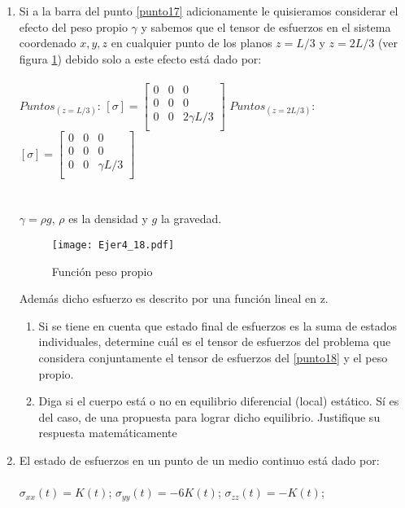 \documentclass[../notas medios.tex]{subfiles}
\begin{document}
\begin{enumerate}
\item \label{punto18}	 Si a la barra del punto \cref{punto17} adicionamente le quisieramos considerar el efecto del peso propio $\gamma$ y sabemos que el tensor de esfuerzos en el sistema coordenado $x,y,z$ en cualquier punto de los planos $z = L/3$ y $z = 2L/3$ (ver figura \ref{barrapeso}) debido solo a este efecto est\'a dado por:\\\\
%
$Puntos_{(z=L/3)}$: $[\sigma] = \left[ \begin{array}{ccc}
0 & 0 & 0\\ 
0 & 0 & 0\\
0 & 0 & 2 \gamma L/3\\
\end{array}  \right] $
\hspace{1cm}
$Puntos_{(z=2L/3)}$: $[\sigma] = \left[ \begin{array}{ccc}
0 & 0 & 0\\ 
0 & 0 & 0\\
0 & 0 & \gamma L/3\\
\end{array}  \right] $
%
\\\\\\
$\gamma = \rho g$, $\rho$ es la densidad y $g$ la gravedad. 
\begin{figure}[H]
	\centering
	\texttt{[image: Ejer4\_18.pdf]} 
	\caption{Funci\'on peso propio}
	\label{barrapeso}
\end{figure}
% 
Adem\'as dicho esfuerzo es descrito por una funci\'on lineal en z.
 \\
\begin{enumerate}
	\item Si se tiene en cuenta que estado final de esfuerzos es la suma de estados individuales, determine cu\'al es el tensor de esfuerzos del problema  que considera conjuntamente el tensor de esfuerzos del \cref{punto18} y el peso propio. 
	\item Diga si el cuerpo est\'a o no en equilibrio diferencial (local) est\'atico. S\'i es del caso, de una propuesta para lograr dicho equilibrio. Justifique su respuesta matem\'aticamente\\  
\end{enumerate}
%	
\item \label{punto19}	 El estado de esfuerzos en un punto de un medio continuo est\'a dado por: \\
 \\
	\hspace*{10mm} $ \sigma_{xx} (t)= K(t)$; \hspace*{5mm} $\sigma_{yy} (t) = -6K(t)$;\hspace*{5mm} $ \sigma_{zz} (t)= -K(t)$; \\\\

\end{enumerate}
\end{document}
